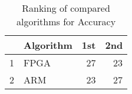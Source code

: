 \begin{table}
\footnotesize
\caption{Ranking of compared algorithms for Accuracy}
\label{tab:places Accuracy}
\begin{tabular}{llrr}
\hline
 & Algorithm & 1st & 2nd \\
\hline
1 & FPGA & 27 & 23 \\
2 & ARM & 23 & 27 \\
\hline
\end{tabular}
\end{table}
